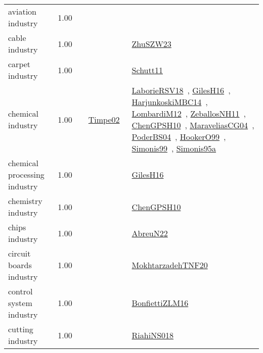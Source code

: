 {\begin{longtable}{p{3cm}r>{\raggedright\arraybackslash}p{6cm}>{\raggedright\arraybackslash}p{6cm}>{\raggedright\arraybackslash}p{8cm}}
\index{aviation industry}\index{Industries!aviation industry}aviation industry &  1.00 &  &  & \\
\index{cable industry}\index{Industries!cable industry}cable industry &  1.00 &  &  & \href{../works/ZhuSZW23.pdf}{ZhuSZW23}~\cite{ZhuSZW23}\\
\index{carpet industry}\index{Industries!carpet industry}carpet industry &  1.00 &  &  & \href{../works/Schutt11.pdf}{Schutt11}~\cite{Schutt11}\\
\index{chemical industry}\index{Industries!chemical industry}chemical industry &  1.00 &  & \href{../works/Timpe02.pdf}{Timpe02}~\cite{Timpe02} & \href{../works/LaborieRSV18.pdf}{LaborieRSV18}~\cite{LaborieRSV18}, \href{../works/GilesH16.pdf}{GilesH16}~\cite{GilesH16}, \href{../works/HarjunkoskiMBC14.pdf}{HarjunkoskiMBC14}~\cite{HarjunkoskiMBC14}, \href{../works/LombardiM12.pdf}{LombardiM12}~\cite{LombardiM12}, \href{../works/ZeballosNH11.pdf}{ZeballosNH11}~\cite{ZeballosNH11}, \href{../works/ChenGPSH10.pdf}{ChenGPSH10}~\cite{ChenGPSH10}, \href{../works/MaraveliasCG04.pdf}{MaraveliasCG04}~\cite{MaraveliasCG04}, \href{../works/PoderBS04.pdf}{PoderBS04}~\cite{PoderBS04}, \href{../works/HookerO99.pdf}{HookerO99}~\cite{HookerO99}, \href{../works/Simonis99.pdf}{Simonis99}~\cite{Simonis99}, \href{../works/Simonis95a.pdf}{Simonis95a}~\cite{Simonis95a}\\
\index{chemical processing industry}\index{Industries!chemical processing industry}chemical processing industry &  1.00 &  &  & \href{../works/GilesH16.pdf}{GilesH16}~\cite{GilesH16}\\
\index{chemistry industry}\index{Industries!chemistry industry}chemistry industry &  1.00 &  &  & \href{../works/ChenGPSH10.pdf}{ChenGPSH10}~\cite{ChenGPSH10}\\
\index{chips industry}\index{Industries!chips industry}chips industry &  1.00 &  &  & \href{../works/AbreuN22.pdf}{AbreuN22}~\cite{AbreuN22}\\
\index{circuit boards industry}\index{Industries!circuit boards industry}circuit boards industry &  1.00 &  &  & \href{../works/MokhtarzadehTNF20.pdf}{MokhtarzadehTNF20}~\cite{MokhtarzadehTNF20}\\
\index{control system industry}\index{Industries!control system industry}control system industry &  1.00 &  &  & \href{../works/BonfiettiZLM16.pdf}{BonfiettiZLM16}~\cite{BonfiettiZLM16}\\
\index{cutting industry}\index{Industries!cutting industry}cutting industry &  1.00 &  &  & \href{../works/RiahiNS018.pdf}{RiahiNS018}~\cite{RiahiNS018}\\

\end{longtable}}
